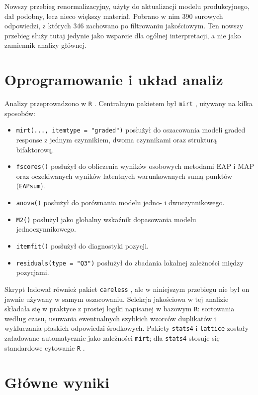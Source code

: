 \documentclass[11pt,a4paper]{article}
\begin{document}
Nowszy przebieg renormalizacyjny, użyty do aktualizacji modelu produkcyjnego, dał podobny, lecz nieco większy materiał. Pobrano w nim 390 surowych odpowiedzi, z których 346 zachowano po filtrowaniu jakościowym. Ten nowszy przebieg służy tutaj jedynie jako wsparcie dla ogólnej interpretacji, a nie jako zamiennik analizy głównej.

\section{Oprogramowanie i układ analiz}
Analizy przeprowadzono w \texttt{R} \parencite{RCore2026}. Centralnym pakietem był \texttt{mirt} \parencite{Chalmers2012mirt}, używany na kilka sposobów:

\begin{itemize}
\item \texttt{mirt(..., itemtype = "graded")} posłużył do oszacowania modeli graded response z jednym czynnikiem, dwoma czynnikami oraz strukturą bifaktorową.
\item \texttt{fscores()} posłużył do obliczenia wyników osobowych metodami EAP i MAP oraz oczekiwanych wyników latentnych warunkowanych sumą punktów (\texttt{EAPsum}).
\item \texttt{anova()} posłużył do porównania modelu jedno- i dwuczynnikowego.
\item \texttt{M2()} posłużył jako globalny wskaźnik dopasowania modelu jednoczynnikowego.
\item \texttt{itemfit()} posłużył do diagnostyki pozycji.
\item \texttt{residuals(type = "Q3")} posłużył do zbadania lokalnej zależności między pozycjami.
\end{itemize}

Skrypt ładował również pakiet \texttt{careless} \parencite{YentesWilhelm2023careless}, ale w niniejszym przebiegu nie był on jawnie używany w samym oszacowaniu. Selekcja jakościowa w tej analizie składała się w praktyce z prostej logiki napisanej w bazowym \texttt{R}: sortowania według czasu, usuwania ewentualnych szybkich wzorców duplikatów i wykluczania płaskich odpowiedzi środkowych. Pakiety \texttt{stats4} i \texttt{lattice} \parencite{Sarkar2008lattice} zostały załadowane automatycznie jako zależności \texttt{mirt}; dla \texttt{stats4} stosuje się standardowe cytowanie \texttt{R} \parencite{RCore2026}.

\section{Główne wyniki}
\end{document}
